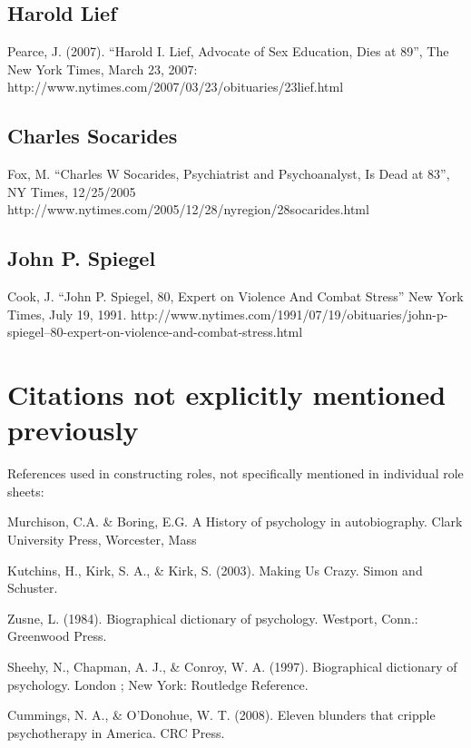 \subsection{Harold Lief}
\label{haroldlief}

Pearce, J. (2007). ``Harold I. Lief, Advocate of Sex Education, Dies at 89'', The New York Times, March 23, 2007: http:\slash \slash www.nytimes.com\slash 2007\slash 03\slash 23\slash obituaries\slash 23lief.html 

\subsection{Charles Socarides}
\label{charlessocarides}

Fox, M. ``Charles W Socarides, Psychiatrist and Psychoanalyst, Is Dead at 83'', NY Times, 12\slash 25\slash 2005 http:\slash \slash www.nytimes.com\slash 2005\slash 12\slash 28\slash nyregion\slash 28socarides.html

\subsection{John P. Spiegel}
\label{johnp.spiegel}

Cook, J. ``John P. Spiegel, 80, Expert on Violence And Combat Stress'' New York Times, July 19, 1991. http:\slash \slash www.nytimes.com\slash 1991\slash 07\slash 19\slash obituaries\slash john-p-spiegel--80-expert-on-violence-and-combat-stress.html

\section{Citations not explicitly mentioned previously}
\label{citationsnotexplicitlymentionedpreviously}

References used in constructing roles, not specifically mentioned in individual role sheets:

Murchison, C.A. \& Boring, E.G. A History of psychology in autobiography. Clark University Press, Worcester, Mass

Kutchins, H., Kirk, S. A., \& Kirk, S. (2003). Making Us Crazy. Simon and Schuster.

Zusne, L. (1984). Biographical dictionary of psychology. Westport, Conn.: Greenwood Press.

Sheehy, N., Chapman, A. J., \& Conroy, W. A. (1997). Biographical dictionary of psychology. London ; New York: Routledge Reference.

Cummings, N. A., \& O'Donohue, W. T. (2008). Eleven blunders that cripple psychotherapy in America. CRC Press.

